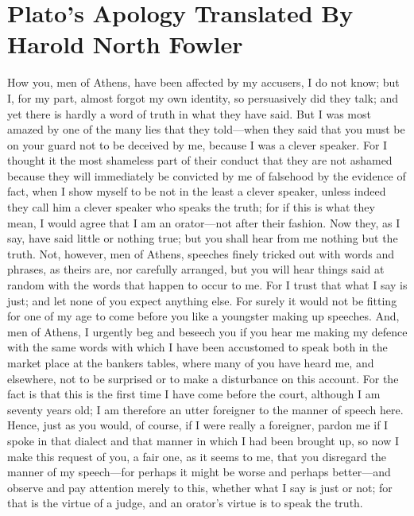\chapter{Plato's Apology Translated By Harold North Fowler}
\label{platoapology}

How you, men of Athens, have been affected by my accusers, I do not know; but I, for my part, almost forgot my own identity, so persuasively did they talk; and yet there is hardly a word of truth in what they have said. But I was most amazed by one of the many lies that they told—when they said that you must be on your guard not to be deceived by me,  because I was a clever speaker. For I thought it the most shameless part of their conduct that they are not ashamed because they will immediately be convicted by me of falsehood by the evidence of fact, when I show myself to be not in the least a clever speaker, unless indeed they call him a clever speaker who speaks the truth; for if this is what they mean, I would agree that I am an orator—not after their fashion. Now they, as I say, have said little or nothing true; but you shall hear from me nothing but the truth. Not, however, men of Athens, speeches finely tricked out with words and phrases,  as theirs are, nor carefully arranged, but you will hear things said at random with the words that happen to occur to me. For I trust that what I say is just; and let none of you expect anything else. For surely it would not be fitting for one of my age to come before you like a youngster making up speeches. And, men of Athens, I urgently beg and beseech you if you hear me making my defence with the same words with which I have been accustomed to speak both in the market place at the bankers tables, where many of you have heard me, and elsewhere, not to be surprised or to make a disturbance on this account. For the fact is that this is the first time I have come before the court, although I am seventy years old; I am therefore an utter foreigner to the manner of speech here. Hence, just as you would, of course, if I were really a foreigner, pardon me if I spoke in that dialect and that manner  in which I had been brought up, so now I make this request of you, a fair one, as it seems to me, that you disregard the manner of my speech—for perhaps it might be worse and perhaps better—and observe and pay attention merely to this, whether what I say is just or not; for that is the virtue of a judge, and an orator's virtue is to speak the truth.

